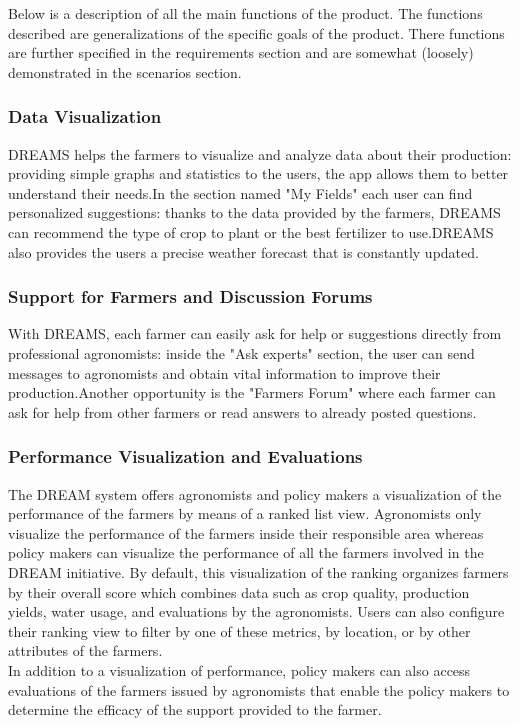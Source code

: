 \begin{flushleft}

Below is a description of all the main functions of the product. The functions described are generalizations of the specific goals of the product. There functions are further specified in the requirements section and are somewhat (loosely) demonstrated in the scenarios section. 

\subsubsection{Data Visualization}
DREAMS helps the farmers to visualize and analyze data about their production: providing simple graphs and statistics to the users, the app allows them to better understand their needs.In the section named "My Fields" each user can find personalized suggestions: thanks to the data provided by the farmers, DREAMS can recommend the type of crop to plant or the best fertilizer to use.DREAMS also provides the users a precise weather forecast that is constantly updated.

\subsubsection{Support for Farmers and Discussion Forums}
With DREAMS, each farmer can easily ask for help or suggestions directly from professional agronomists: inside the "Ask experts" section, the user can send messages to agronomists and obtain vital information to improve their production.Another opportunity is the "Farmers Forum" where each farmer can ask for help from other farmers or read answers to already posted questions.

\subsubsection{Performance Visualization and Evaluations}
The DREAM system offers agronomists and policy makers a visualization of the performance of the farmers by means of a ranked list view. Agronomists only visualize the performance of the farmers inside their responsible area whereas policy makers can visualize the performance of all the farmers involved in the DREAM initiative. By default, this visualization of the ranking organizes farmers by their overall score which combines data such as crop quality, production yields, water usage, and evaluations by the agronomists. Users can also configure their ranking view to filter by one of these metrics, by location, or by other attributes of the farmers. \\
\smallskip
In addition to a visualization of performance, policy makers can also access evaluations of the farmers issued by agronomists that enable the policy makers to determine the efficacy of the support provided to the farmer. 


\end{flushleft}
